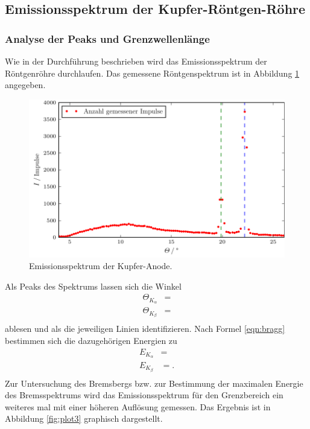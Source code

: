 \subsection{Emissionsspektrum der Kupfer-Röntgen-Röhre}
\subsubsection{Analyse der Peaks und Grenzwellenlänge}
Wie in der Durchführung beschrieben wird das Emissionsspektrum der Röntgenröhre durchlaufen.
Das gemessene Röntgenspektrum ist in Abbildung \ref{fig:plot2} angegeben.
\begin{figure}
  \centering
  \includegraphics{build/plot_2.pdf}
  \caption{Emissionsspektrum der Kupfer-Anode.}
  \label{fig:plot2}
\end{figure}
Als Peaks des Spektrums lassen sich die Winkel
\begin{align*}
   \Theta_{K_\alpha} &=  \\
   \Theta_{K_\beta} &=  \\
\end{align*}
ablesen und als die jeweiligen Linien identifizieren.
Nach Formel \eqref{eqn:bragg} bestimmen sich die dazugehörigen Energien zu
\begin{align*}
  E_{K_\alpha} &=  \\
  E_{K_\beta} &= . \\
\end{align*}
Zur Untersuchung des Bremsbergs bzw. zur Bestimmung der maximalen Energie des Bremsspektrums wird das Emissionsspektrum für den Grenzbereich ein weiteres mal mit einer höheren Auflösung gemessen.
Das Ergebnis ist in Abbildung \ref{fig:plot3} graphisch dargestellt.

